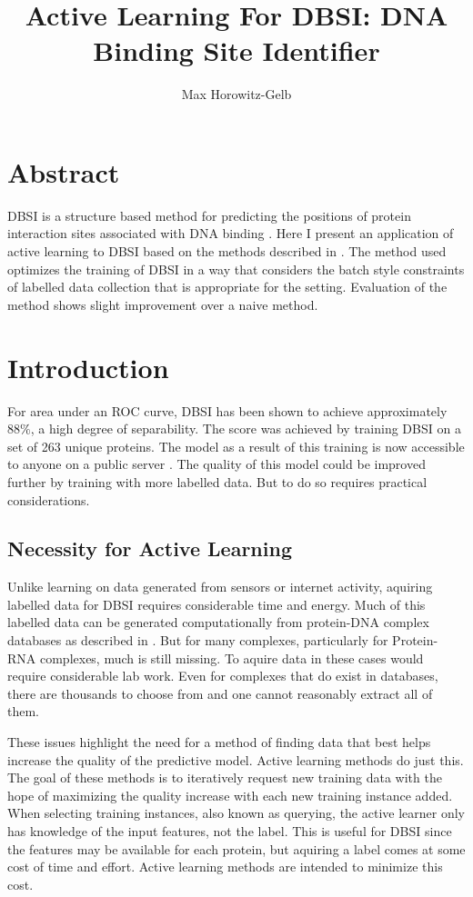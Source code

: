 \documentclass{article}
\begin{document}
\author{Max Horowitz-Gelb}
\title{Active Learning For DBSI: DNA Binding Site Identifier }
\maketitle

\section*{Abstract}
DBSI is a structure based method for predicting the positions of protein interaction sites associated with DNA binding \cite{dbsi}. Here I present an application of active learning to DBSI based on the methods described in \cite{active_learning}. The method used optimizes the training of DBSI in a way that considers the batch style constraints of labelled data collection that is appropriate for the setting. Evaluation of the method shows slight improvement over a naive method.
\section*{Introduction}
For area under an ROC curve, DBSI has been shown to achieve approximately $88\%$, a high degree of separability. The score was achieved by training DBSI on a set of 263 unique proteins. The model as a result of this training is now accessible to anyone on a public server \cite{dbsi_server}. The quality of this model could be improved further by training with more labelled data. But to do so requires practical considerations.
\subsection*{Necessity for Active Learning}
Unlike learning on data generated from sensors or internet activity, aquiring labelled data for DBSI requires considerable time and energy. Much of this labelled data can be generated computationally from protein-DNA complex databases as described in \cite{displar}.
But for many complexes, particularly for Protein-RNA complexes, much is still missing. To aquire data in these cases would require considerable lab work. Even for complexes that do exist in databases, there are thousands to choose from and one cannot reasonably extract all of them. 

These issues highlight the need for a method of finding data that best helps increase the quality of the predictive model. Active learning methods do just this. The goal of these methods is to iteratively request new training data with the hope of maximizing the quality increase with each new training instance added. When selecting training instances, also known as querying, the active learner only has knowledge of the input features, not the label. This is useful for DBSI since the features may be available for each protein, but aquiring a label comes at some cost of time and effort. Active learning methods are intended to minimize this cost.
\end{document}
